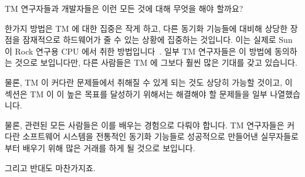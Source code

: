 TM 연구자들과 개발자들은 이런 모든 것에 대해 무엇을 해야 할까요?

한가지 방법은 TM 에 대한 집중은 작게 하고, 다른 동기화 기능들에 대비해 상당한
장점을 잠재적으로 하드웨어가 줄 수 있는 상황에 집중하는 것입니다.
이는 실제로 Sun 이 Rock 연구용 CPU 에서 취한
방법입니다~\cite{DaveDice2009ASPLOSRockHTM}.
일부 TM 연구자들은 이 방법에 동의하는 것으로 보입니다만, 다른 사람들은 TM 에
그보다 훨씬 많은 기대를 갖고 있습니다.

물론, TM 이 커다란 문제들에서 취해질 수 있게 되는 것도 상당히 가능할 것이고, 이
섹션은 TM 이 이 높은 목표를 달성하기 위해서는 해결해야 할 문제들을 일부
나열했습니다.

물론, 관련된 모든 사람들은 이를 배우는 경험으로 다뤄야 합니다.
TM 연구자들은 커다란 소프트웨어 시스템을 전통적인 동기화 기능들로 성공적으로
만들어낸 실무자들로부터 배우기 위해 많은 거래를 하게 될 것으로 보입니다.

그리고 반대도 마찬가지죠.

